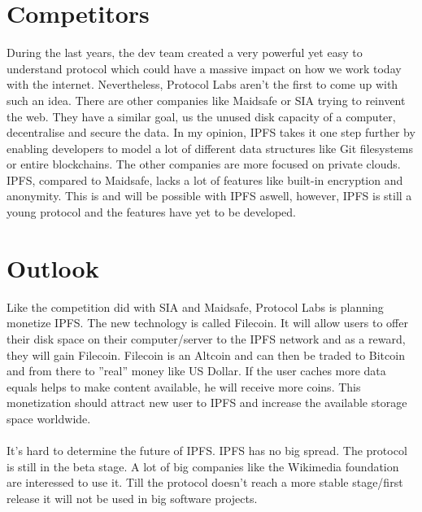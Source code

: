 \documentclass[a4paper,11pt, oneside]{report}
\theoremstyle{definition}
\begin{document}
\section{Competitors}
During the last years, the dev team created a very powerful yet easy to understand protocol which could have a massive impact on how we work today with the internet. Nevertheless, Protocol Labs aren't the first to come up with such an idea.
There are other companies like Maidsafe \cite{Maidsafe} or SIA  \cite{sia} trying to reinvent the web. They have a similar goal, us the unused disk capacity of a computer, decentralise and secure the data. In my opinion, IPFS takes it one step further by enabling developers to model a lot of different data structures like Git filesystems or entire blockchains. The other companies are more focused on private clouds. IPFS, compared to Maidsafe, lacks a lot of features like built-in encryption and anonymity. This is and will be possible with IPFS aswell, however, IPFS is still a young protocol and the features have yet to be developed.

\section{Outlook}
Like the competition did with SIA and Maidsafe, Protocol Labs is planning monetize IPFS. The new technology is called Filecoin. It will allow users to offer their disk space on their computer/server to the IPFS network and as a reward, they will gain Filecoin. Filecoin is an Altcoin and can then be traded to Bitcoin and from there to ''real'' money like US Dollar. If the user caches more data equals helps to make content available, he will receive more coins. This monetization should attract new user to IPFS and increase the available storage space worldwide.\\ \\
It's hard to determine the future of IPFS.  IPFS has no big spread. The protocol is still in the beta stage. A lot of big companies like the Wikimedia foundation are interessed to use it.  Till the protocol doesn't reach a more stable stage/first release  it will not be used in big software projects.\\
\end{document}
